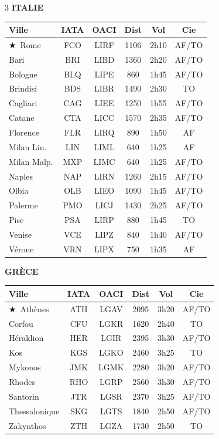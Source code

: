 \documentclass[9pt,a4paper,landscape]{article}
\newcommand{\CAP}{\textcolor{capgold}{$\bigstar$}}
\begin{document}
\begin{multicols}{3}
\vspace{0.15cm}
\textbf{\color{eurblue}ITALIE}\\[-0.1cm]
\begin{tabular}{@{}l c c c c c@{}}
\toprule
\textbf{Ville} & \textbf{IATA} & \textbf{OACI} & \textbf{Dist} & \textbf{Vol} & \textbf{Cie} \\
\midrule
\rowcolor{eurlight}\CAP\ Rome & FCO & LIRF & 1106 & 2h10 & AF/TO \\
Bari & BRI & LIBD & 1360 & 2h20 & AF/TO \\
\rowcolor{eurlight} Bologne & BLQ & LIPE & 860 & 1h45 & AF/TO \\
Brindisi & BDS & LIBR & 1490 & 2h30 & TO \\
\rowcolor{eurlight} Cagliari & CAG & LIEE & 1250 & 1h55 & AF/TO \\
Catane & CTA & LICC & 1570 & 2h35 & AF/TO \\
\rowcolor{eurlight} Florence & FLR & LIRQ & 890 & 1h50 & AF \\
Milan Lin. & LIN & LIML & 640 & 1h25 & AF \\
\rowcolor{eurlight} Milan Malp. & MXP & LIMC & 640 & 1h25 & AF/TO \\
Naples & NAP & LIRN & 1260 & 2h15 & AF/TO \\
\rowcolor{eurlight} Olbia & OLB & LIEO & 1090 & 1h45 & AF/TO \\
Palerme & PMO & LICJ & 1430 & 2h25 & AF/TO \\
\rowcolor{eurlight} Pise & PSA & LIRP & 880 & 1h45 & TO \\
Venise & VCE & LIPZ & 840 & 1h40 & AF/TO \\
\rowcolor{eurlight} Vérone & VRN & LIPX & 750 & 1h35 & AF \\
\bottomrule
\end{tabular}

\vspace{0.15cm}
\textbf{\color{eurblue}GRÈCE}\\[-0.1cm]
\begin{tabular}{@{}l c c c c c@{}}
\toprule
\textbf{Ville} & \textbf{IATA} & \textbf{OACI} & \textbf{Dist} & \textbf{Vol} & \textbf{Cie} \\
\midrule
\rowcolor{eurlight}\CAP\ Athènes & ATH & LGAV & 2095 & 3h20 & AF/TO \\
Corfou & CFU & LGKR & 1620 & 2h40 & TO \\
\rowcolor{eurlight} Héraklion & HER & LGIR & 2395 & 3h30 & AF/TO \\
Kos & KGS & LGKO & 2460 & 3h25 & TO \\
\rowcolor{eurlight} Mykonos & JMK & LGMK & 2280 & 3h20 & AF/TO \\
Rhodes & RHO & LGRP & 2560 & 3h30 & AF/TO \\
\rowcolor{eurlight} Santorin & JTR & LGSR & 2370 & 3h25 & AF/TO \\
Thessalonique & SKG & LGTS & 1840 & 2h50 & AF/TO \\
\rowcolor{eurlight} Zakynthos & ZTH & LGZA & 1730 & 2h50 & TO\\
\bottomrule
\end{tabular}


\end{multicols}
\end{document}

